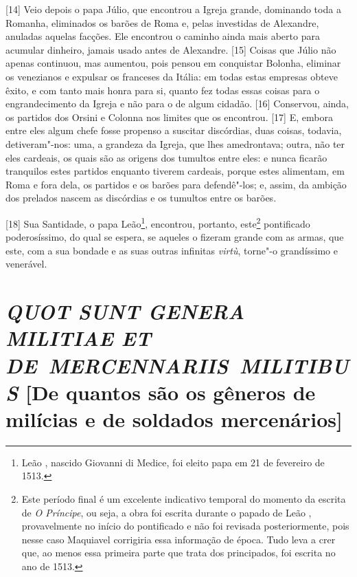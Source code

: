 {[}14{]} Veio depois o papa Júlio, que encontrou a Igreja grande,
dominando toda a Romanha, eliminados os barões de Roma e, pelas
investidas de Alexandre, anuladas aquelas facções. Ele encontrou o
caminho ainda mais aberto para acumular dinheiro, jamais usado antes de
Alexandre. {[}15{]} Coisas que Júlio não apenas continuou, mas aumentou,
pois pensou em conquistar Bolonha, eliminar os venezianos e expulsar os
franceses da Itália: em todas estas empresas obteve êxito, e com tanto
mais honra para si, quanto fez todas essas coisas para o engrandecimento
da Igreja e não para o de algum cidadão. {[}16{]} Conservou, ainda, os
partidos dos Orsini e Colonna nos limites que os encontrou. {[}17{]} E,
embora entre eles algum chefe fosse propenso a suscitar discórdias, duas
coisas, todavia, detiveram"-nos: uma, a grandeza da Igreja, que lhes
amedrontava; outra, não ter eles cardeais, os quais são as origens dos
tumultos entre eles: e nunca ficarão tranquilos estes partidos enquanto
tiverem cardeais, porque estes alimentam, em Roma e fora dela, os partidos e os barões para
defendê"-los; e, assim, da ambição dos prelados nascem as discórdias e os
tumultos entre os barões.

{[}18{]} Sua Santidade, o papa Leão\footnote{Leão , nascido Giovanni di
  Medice, foi eleito papa em 21 de fevereiro de 1513.}, encontrou,
portanto, este\footnote{Este período final é um excelente indicativo
  temporal do momento da escrita de \emph{O Príncipe}, ou seja, a obra
  foi escrita durante o papado de Leão , provavelmente no início do
  pontificado e não foi revisada posteriormente, pois nesse caso
  Maquiavel corrigiria essa informação de época. Tudo leva a crer que,
  ao menos essa primeira parte que trata dos principados, foi escrita no
  ano de 1513.} pontificado poderosíssimo, do qual se espera, se aqueles
o fizeram grande com as armas, que este, com a sua bondade e as suas
outras infinitas \emph{virtù}, torne"-o grandíssimo e venerável.

\quebra\section{\emph{QUOT SUNT GENERA MILITIAE ET DE~MERCENNARIIS~MILITIBUS}\break
{[}De quantos são os gêneros de milícias e de soldados mercenários{]}}

